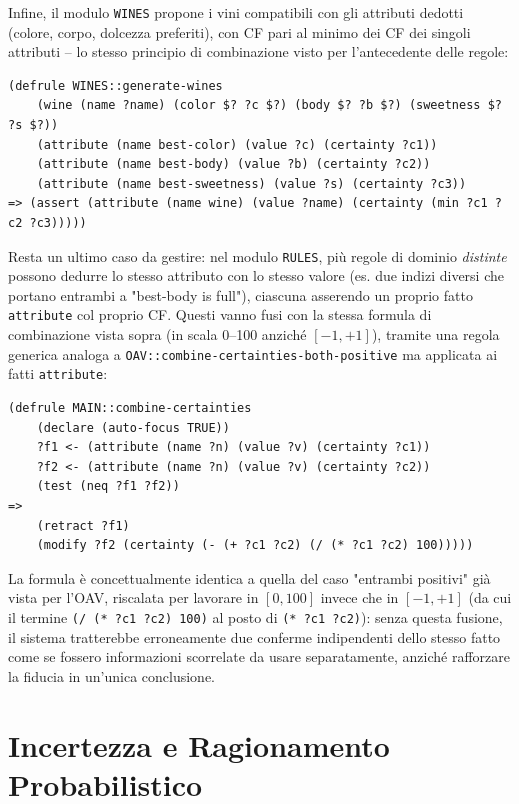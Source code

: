 \documentclass[a4paper,11pt]{article}
\begin{document}
Infine, il modulo \texttt{WINES} propone i vini compatibili con gli attributi dedotti (colore, corpo, dolcezza preferiti), con CF pari al minimo dei CF dei singoli attributi -- lo stesso principio di combinazione visto per l'antecedente delle regole:
\begin{lstlisting}
(defrule WINES::generate-wines
    (wine (name ?name) (color $? ?c $?) (body $? ?b $?) (sweetness $? ?s $?))
    (attribute (name best-color) (value ?c) (certainty ?c1))
    (attribute (name best-body) (value ?b) (certainty ?c2))
    (attribute (name best-sweetness) (value ?s) (certainty ?c3))
=> (assert (attribute (name wine) (value ?name) (certainty (min ?c1 ?c2 ?c3)))))
\end{lstlisting}
Resta un ultimo caso da gestire: nel modulo \texttt{RULES}, più regole di dominio \emph{distinte} possono dedurre lo stesso attributo con lo stesso valore (es. due indizi diversi che portano entrambi a "best-body is full"), ciascuna asserendo un proprio fatto \texttt{attribute} col proprio CF. Questi vanno fusi con la stessa formula di combinazione vista sopra (in scala 0--100 anziché $[-1,+1]$), tramite una regola generica analoga a \texttt{OAV::combine-certainties-both-positive} ma applicata ai fatti \texttt{attribute}:
\begin{lstlisting}
(defrule MAIN::combine-certainties
    (declare (auto-focus TRUE))
    ?f1 <- (attribute (name ?n) (value ?v) (certainty ?c1))
    ?f2 <- (attribute (name ?n) (value ?v) (certainty ?c2))
    (test (neq ?f1 ?f2))
=>
    (retract ?f1)
    (modify ?f2 (certainty (- (+ ?c1 ?c2) (/ (* ?c1 ?c2) 100)))))
\end{lstlisting}
La formula è concettualmente identica a quella del caso "entrambi positivi" già vista per l'OAV, riscalata per lavorare in $[0,100]$ invece che in $[-1,+1]$ (da cui il termine \texttt{(/ (* ?c1 ?c2) 100)} al posto di \texttt{(* ?c1 ?c2)}): senza questa fusione, il sistema tratterebbe erroneamente due conferme indipendenti dello stesso fatto come se fossero informazioni scorrelate da usare separatamente, anziché rafforzare la fiducia in un'unica conclusione.

\newpage
\section{Incertezza e Ragionamento Probabilistico}
\end{document}
